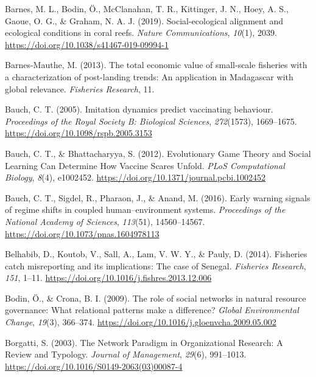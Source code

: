 \documentclass[
  12pt,
]{article}
\newlength{\cslhangindent}
\newenvironment{CSLReferences}[2] %
 {\begin{list}{}{%
  \setlength{\itemindent}{0pt}
  \setlength{\leftmargin}{0pt}
  \setlength{\parsep}{0pt}
  \ifodd #1
   \setlength{\leftmargin}{\cslhangindent}
   \setlength{\itemindent}{-1\cslhangindent}
  \fi
  \setlength{\itemsep}{#2\baselineskip}}}
 {\end{list}}
\begin{document}
\begin{CSLReferences}{1}{2}
Barnes, M. L., Bodin, Ö., McClanahan, T. R., Kittinger, J. N., Hoey, A. S., Gaoue, O. G., \& Graham, N. A. J. (2019). Social-ecological alignment and ecological conditions in coral reefs. \emph{Nature Communications}, \emph{10}(1), 2039. \url{https://doi.org/10.1038/s41467-019-09994-1}

Barnes-Mauthe, M. (2013). The total economic value of small-scale fisheries with a characterization of post-landing trends: {An} application in {Madagascar} with global relevance. \emph{Fisheries Research}, 11.

Bauch, C. T. (2005). Imitation dynamics predict vaccinating behaviour. \emph{Proceedings of the Royal Society B: Biological Sciences}, \emph{272}(1573), 1669--1675. \url{https://doi.org/10.1098/rspb.2005.3153}

Bauch, C. T., \& Bhattacharyya, S. (2012). Evolutionary {Game Theory} and {Social Learning Can Determine How Vaccine Scares Unfold}. \emph{PLoS Computational Biology}, \emph{8}(4), e1002452. \url{https://doi.org/10.1371/journal.pcbi.1002452}

Bauch, C. T., Sigdel, R., Pharaon, J., \& Anand, M. (2016). Early warning signals of regime shifts in coupled human--environment systems. \emph{Proceedings of the National Academy of Sciences}, \emph{113}(51), 14560--14567. \url{https://doi.org/10.1073/pnas.1604978113}

Belhabib, D., Koutob, V., Sall, A., Lam, V. W. Y., \& Pauly, D. (2014). Fisheries catch misreporting and its implications: {The} case of {Senegal}. \emph{Fisheries Research}, \emph{151}, 1--11. \url{https://doi.org/10.1016/j.fishres.2013.12.006}

Bodin, Ö., \& Crona, B. I. (2009). The role of social networks in natural resource governance: {What} relational patterns make a difference? \emph{Global Environmental Change}, \emph{19}(3), 366--374. \url{https://doi.org/10.1016/j.gloenvcha.2009.05.002}

Borgatti, S. (2003). The {Network Paradigm} in {Organizational Research}: {A Review} and {Typology}. \emph{Journal of Management}, \emph{29}(6), 991--1013. \url{https://doi.org/10.1016/S0149-2063(03)00087-4}


\end{CSLReferences}
\end{document}
